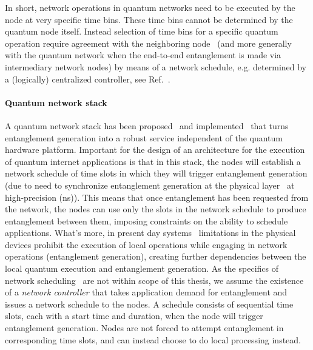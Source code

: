 In short, network operations in quantum networks need to be executed by the node at very specific time bins.
These time bins cannot be determined by the quantum node itself.
Instead selection of time bins for a specific quantum operation require agreement with the neighboring node~\cite{dahlberg_2019_egp} (and more generally with the quantum network when the end-to-end entanglement is made via intermediary network nodes) by means of a network schedule, e.g. determined by a (logically) centralized controller, see Ref.~\cite{skrzypczyk_2021_arch}.

\paragraph{Quantum network stack}
A quantum network stack has been proposed~\cite{dahlberg2019link} and implemented~\cite{pompili2022experimental} that turns entanglement generation into a robust service independent of the quantum hardware platform.
Important for the design of an architecture for the execution of quantum internet applications is that in this stack, the nodes will establish a network schedule of time slots in which they will trigger entanglement generation (due to need to synchronize entanglement generation at the physical layer~\cite{dahlberg2019link} at high-precision (ns)).
This means that once entanglement has been requested from the network, the nodes can use only the slots in the network schedule to produce entanglement between them, imposing constraints on the ability to schedule applications. What's more, in present day systems~\cite{pompili2021realization, krutyanskiy2023entanglement} limitations in the physical devices prohibit the execution of local operations while engaging in network operations (entanglement generation), creating further dependencies between the local quantum execution and entanglement generation. 
As the specifics of network scheduling~\cite{network-scheduling, skrzypczyk2021architecture} are not within scope of this thesis,
we assume the existence of a \textit{network controller} that takes application demand for entanglement and issues a network schedule to the nodes. 
A schedule consists of sequential time slots, each with a start time and duration, when the node will trigger entanglement generation.
Nodes are not forced to attempt entanglement in corresponding time slots, and can instead choose to do local processing instead.



